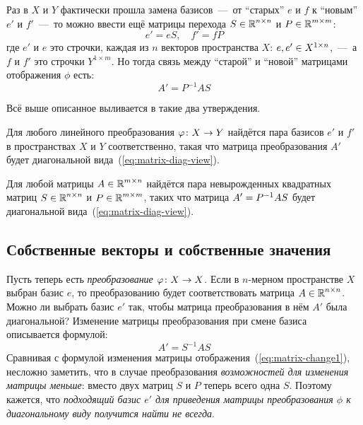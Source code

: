 \documentclass[a4paper,12pt]{article}
\begin{document}
  Раз в $X$ и $Y$ фактически прошла замена базисов~---~от ``старых'' $e$ и $f$ к ``новым'' $e'$ и $f'$~---~то можно ввести ещё матрицы перехода $S \hm\in \RR^{n\times n}$ и $P \hm\in \RR^{m\times m}$:
  \[
    e' = e S,\quad f' = f P
  \]
  где $e'$ и $e$ это строчки, каждая из $n$ векторов пространства $X$: $e, e' \hm\in X^{1\times n}$,~---~а $f$ и $f'$ это строчки $Y^{1\times m}$.
  Но тогда связь между ``старой'' и ``новой'' матрицами отображения $\phi$ есть:
  \begin{equation}\label{eq:matrix-change1}
    A' = P^{-1} A S
  \end{equation}
  
  Всё выше описанное выливается в такие два утверждения.
  
  \begin{theorem}
    Для любого линейного преобразования $\phi\colon X \hm\to Y$ найдётся пара базисов $e'$ и $f'$ в пространствах $X$ и $Y$ соответственно, такая что матрица преобразования $A'$ будет диагональной вида~(\ref{eq:matrix-diag-view}). 
  \end{theorem}
  
  \begin{theorem}
    Для любой матрицы $A \hm\in \RR^{m \times n}$ найдётся пара невырожденных квадратных матриц $S \hm\in \RR^{n\times n}$ и $P \hm\in \RR^{m\times m}$, таких что матрица $A' \hm= P^{-1} A S$ будет диагональной вида~(\ref{eq:matrix-diag-view}). 
  \end{theorem}
  
  
  \subsection{Собственные векторы и собственные значения}
  
  Пусть теперь есть \emph{преобразование} $\phi\colon X \hm\to X$.
  Если в $n$-мерном пространстве $X$ выбран базис $e$, то преобразованию будет соответствовать матрица $A \hm\in \RR^{n\times n}$.
  Можно ли выбрать базис $e'$ так, чтобы матрица преобразования в нём $A'$ была диагональной?
  Изменение матрицы преобразования при смене базиса описывается формулой:
  \begin{equation}\label{eq:matrix-change2}
    A' = S^{-1} A S
  \end{equation}
  Сравнивая с формулой изменения матрицы отображения~(\ref{eq:matrix-change1}), несложно заметить, что в случае преобразования \emph{возможностей для изменения матрицы меньше}: вместо двух матриц $S$ и $P$ теперь всего одна $S$.
  Поэтому кажется, что \emph{подходящий базис $e'$ для приведения матрицы преобразования $\phi$ к диагональному виду получится найти не всегда}.
  
\end{document}
